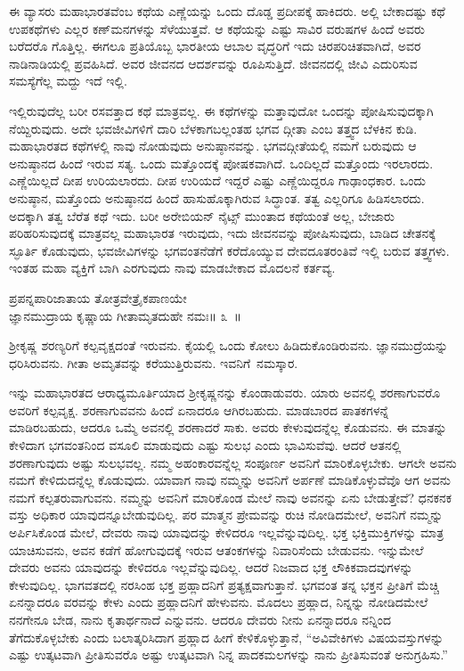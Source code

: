ಈ ವ್ಯಾಸರು ಮಹಾಭಾರತವೆಂಬ ಕಥೆಯ ಎಣ್ಣೆಯನ್ನು ಒಂದು ದೊಡ್ಡ ಪ್ರದೀಪಕ್ಕೆ ಹಾಕಿದರು. ಅಲ್ಲಿ ಬೇಕಾದಷ್ಟು ಕಥೆ ಉಪಕಥೆಗಳು ಎಲ್ಲರ ಕಣ್​ಮನಗಳನ್ನು ಸೆಳೆಯುತ್ತವೆ. ಆ ಕಥೆಯನ್ನು ಎಷ್ಟು ಸಾವಿರ ವರುಷಗಳ ಹಿಂದೆ ಅವರು ಬರೆದರೊ ಗೊತ್ತಿಲ್ಲ. ಈಗಲೂ ಪ್ರತಿಯೊಬ್ಬ ಭಾರತೀಯ ಆಬಾಲ ವೃದ್ಧರಿಗೆ ಇದು ಚಿರಪರಿಚಿತವಾಗಿದೆ, ಅವರ ನಾಡಿನಾಡಿಯಲ್ಲಿ ಪ್ರವಹಿಸಿದೆ. ಅವರ ಜೀವನದ ಆದರ್ಶವನ್ನು ರೂಪಿಸುತ್ತಿದೆ. ಜೀವನದಲ್ಲಿ ಜೀವಿ ಎದುರಿಸುವ ಸಮಸ್ಯೆಗೆಲ್ಲ ಮದ್ದು ಇದೆ ಇಲ್ಲಿ.

ಇಲ್ಲಿರುವುದೆಲ್ಲ ಬರೀ ರಸವತ್ತಾದ ಕಥೆ ಮಾತ್ರವಲ್ಲ. ಈ ಕಥೆಗಳನ್ನು ಮತ್ತಾವುದೋ ಒಂದನ್ನು ಪೋಷಿಸುವುದಕ್ಕಾಗಿ ನೆಯ್ದಿರುವುದು. ಅದೇ ಭವಜೀವಿಗಳಿಗೆ ದಾರಿ ಬೆಳಕಾಗಬಲ್ಲಂತಹ ಭಗವ ದ್ಗೀತಾ ಎಂಬ ತತ್ತ್ವದ ಬೆಳಕಿನ ಕುಡಿ. ಮಹಾಭಾರತದ ಕಥೆಗಳಲ್ಲಿ ನಾವು ನೋಡುವುದು ಅನುಷ್ಠಾನವನ್ನು. ಭಗವದ್ಗೀತೆಯಲ್ಲಿ ನಮಗೆ ಬರುವುದು ಆ ಅನುಷ್ಠಾನದ ಹಿಂದೆ ಇರುವ ಸತ್ಯ. ಒಂದು ಮತ್ತೊಂದಕ್ಕೆ ಪೋಷಕವಾಗಿದೆ. ಒಂದಿಲ್ಲದೆ ಮತ್ತೊಂದು ಇರಲಾರದು. ಎಣ್ಣೆಯಿಲ್ಲದೆ ದೀಪ ಉರಿಯಲಾರದು. ದೀಪ ಉರಿಯದೆ ಇದ್ದರೆ ಎಷ್ಟು ಎಣ್ಣೆಯಿದ್ದರೂ ಗಾಢಾಂಧಕಾರ. ಒಂದು ಅನುಷ್ಠಾನ, ಮತ್ತೊಂದು ಅನುಷ್ಠಾನದ ಹಿಂದೆ ಹಾಸುಹೊಕ್ಕಾಗಿರುವ ಸಿದ್ಧಾಂತ. ತತ್ವ ಎಲ್ಲರಿಗೂ ಹಿಡಿಸಲಾರದು. ಅದಕ್ಕಾಗಿ ತತ್ವ ಬೆರೆತ ಕಥೆ ಇದು. ಬರೀ ಅರೇಬಿಯನ್ ನೈಟ್ಸ್ ಮುಂತಾದ ಕಥೆಯಂತೆ ಅಲ್ಲ, ಬೇಜಾರು ಪರಿಹರಿಸುವುದಕ್ಕೆ ಮಾತ್ರವಲ್ಲ ಮಹಾಭಾರತ ಇರುವುದು, ಇದು ಜೀವನವನ್ನು ಪೋಷಿಸುವುದು, ಬಾಡಿದ ಚೇತನಕ್ಕೆ ಸ್ಫೂರ್ತಿ ಕೊಡುವುದು, ಭವಜೀವಿಗಳನ್ನು ಭಗವಂತನೆಡೆಗೆ ಕರೆದೊಯ್ಯುವ ದೇವದೂತರಂತಿವೆ ಇಲ್ಲಿ ಬರುವ ತತ್ತ್ವಗಳು. ಇಂತಹ ಮಹಾ ವ್ಯಕ್ತಿಗೆ ಬಾಗಿ ಎರಗುವುದು ನಾವು ಮಾಡಬೇಕಾದ ಮೊದಲನೆ ಕರ್ತವ್ಯ.

\begin{shloka}
ಪ್ರಪನ್ನಪಾರಿಜಾತಾಯ ತೋತ್ರವೇತ್ರೈಕಪಾಣಯೇ\\ಜ್ಞಾನಮುದ್ರಾಯ ಕೃಷ್ಣಾಯ ಗೀತಾಮೃತದುಹೇ ನಮಃ\hfill॥ ೩~॥
\end{shloka}

\begin{artha}
ಶ‍್ರೀಕೃಷ್ಣ ಶರಣ್ಯರಿಗೆ ಕಲ್ಪವೃಕ್ಷದಂತೆ ಇರುವನು. ಕೈಯಲ್ಲಿ ಒಂದು ಕೋಲು ಹಿಡಿದುಕೊಂಡಿರುವನು. ಜ್ಞಾನಮುದ್ರೆಯನ್ನು ಧರಿಸಿರುವನು. ಗೀತಾ ಅಮೃತವನ್ನು ಕರೆಯುತ್ತಿರುವನು. \hbox\bgroup ಇವನಿಗೆ ನಮಸ್ಕಾರ. \egroup
\end{artha}

ಇನ್ನು ಮಹಾಭಾರತದ ಆರಾಧ್ಯಮೂರ್ತಿಯಾದ ಶ‍್ರೀಕೃಷ್ಣನನ್ನು ಕೊಂಡಾಡುವರು. ಯಾರು ಅವನಲ್ಲಿ ಶರಣಾಗುವರೊ ಅವರಿಗೆ ಕಲ್ಪವೃಕ್ಷ. ಶರಣಾಗುವವನು ಹಿಂದೆ ಏನಾದರೂ ಆಗಿರಬಹುದು. ಮಾಡಬಾರದ ಪಾತಕಗಳನ್ನೆ ಮಾಡಿರಬಹುದು, ಆದರೂ ಒಮ್ಮೆ ಅವನಲ್ಲಿ ಶರಣಾದರೆ ಸಾಕು. ಅವರು ಕೇಳುವುದನ್ನೆಲ್ಲ ಕೊಡುವನು. ಈ ಮಾತನ್ನು ಕೇಳಿದಾಗ ಭಗವಂತನಿಂದ ವಸೂಲಿ ಮಾಡುವುದು ಎಷ್ಟು ಸುಲಭ ಎಂದು ಭಾವಿಸುವೆವು. ಆದರೆ ಆತನಲ್ಲಿ ಶರಣಾಗುವುದು ಅಷ್ಟು ಸುಲಭವಲ್ಲ. ನಮ್ಮ ಅಹಂಕಾರವನ್ನೆಲ್ಲ ಸಂಪೂರ್ಣ ಅವನಿಗೆ ಮಾರಿಕೊಳ್ಳಬೇಕು. ಆಗಲೇ ಅವನು ನಮಗೆ ಕೇಳಿದುದನ್ನೆಲ್ಲ ಕೊಡುವುದು. ಯಾವಾಗ ನಾವು ನಮ್ಮನ್ನು ಅವನಿಗೆ ಅರ್ಪಣೆ ಮಾಡಿಕೊಳ್ಳುವೆವೊ ಆಗ ಅವನು ನಮಗೆ ಕಲ್ಪತರುವಾಗುವನು. ನಮ್ಮನ್ನು ಅವನಿಗೆ ಮಾರಿಕೊಂಡ ಮೇಲೆ ನಾವು ಅವನನ್ನು ಏನು ಬೇಡುತ್ತೇವೆ? ಧನಕನಕ ವಸ್ತು ಅಧಿಕಾರ ಯಾವುದನ್ನೂ\break ಬೇಡುವುದಿಲ್ಲ. ಪರ ಮಾತ್ಮನ ಪ್ರೇಮವನ್ನು ರುಚಿ ನೋಡಿದಮೇಲೆ, ಅವನಿಗೆ ನಮ್ಮನ್ನು ಅರ್ಪಿಸಿಕೊಂಡ ಮೇಲೆ, ದೇವರು ನಾವು ಯಾವುದನ್ನು ಕೇಳಿದರೂ ಇಲ್ಲವೆನ್ನುವುದಿಲ್ಲ. ಭಕ್ತ ಭಕ್ತಿಮುಕ್ತಿಗಳನ್ನು ಮಾತ್ರ ಯಾಚಿಸುವನು, ಅವನ ಕಡೆಗೆ ಹೋಗುವುದಕ್ಕೆ ಇರುವ ಆತಂಕಗಳನ್ನು ನಿವಾರಿಸೆಂದು ಬೇಡುವನು. ಇನ್ನುಮೇಲೆ ದೇವರು ಅವನು ಯಾವುದನ್ನು ಕೇಳಿದರೂ ಇಲ್ಲವೆನ್ನುವುದಿಲ್ಲ. ಆದರೆ ನಿಜವಾದ ಭಕ್ತ ಲೌಕಿಕವಾದವುಗಳನ್ನು ಕೇಳುವುದಿಲ್ಲ. ಭಾಗವತದಲ್ಲಿ ನರಸಿಂಹ ಭಕ್ತ ಪ್ರಹ್ಲಾದನಿಗೆ ಪ್ರತ್ಯಕ್ಷವಾಗುತ್ತಾನೆ. ಭಗವಂತ ತನ್ನ ಭಕ್ತನ ಪ್ರೀತಿಗೆ ಮೆಚ್ಚಿ ಏನನ್ನಾದರೂ ವರವನ್ನು ಕೇಳು ಎಂದು ಪ್ರಹ್ಲಾದನಿಗೆ ಹೇಳುವನು. ಮೊದಲು ಪ್ರಹ್ಲಾದ, ನಿನ್ನನ್ನು ನೋಡಿದಮೇಲೆ ನನಗೇನೂ ಬೇಡ, ನಾನು ಕೃತಾರ್ಥನಾದೆ ಎನ್ನುವನು. ಆದರೂ ದೇವರು ನೀನು ಏನನ್ನಾದರೂ ನನ್ನಿಂದ ತೆಗೆದುಕೊಳ್ಳಬೇಕು ಎಂದು ಬಲಾತ್ಕರಿಸಿದಾಗ ಪ್ರಹ್ಲಾದ ಹೀಗೆ ಕೇಳಿಕೊಳ್ಳುತ್ತಾನೆ, “ಅವಿವೇಕಿಗಳು ವಿಷಯವಸ್ತುಗಳನ್ನು ಎಷ್ಟು ಉತ್ಕಟವಾಗಿ ಪ್ರೀತಿಸುವರೊ ಅಷ್ಟು ಉತ್ಕಟವಾಗಿ ನಿನ್ನ ಪಾದ\-ಕಮಲಗಳನ್ನು ನಾನು ಪ್ರೀತಿಸುವಂತೆ ಅನುಗ್ರಹಿಸು.”

